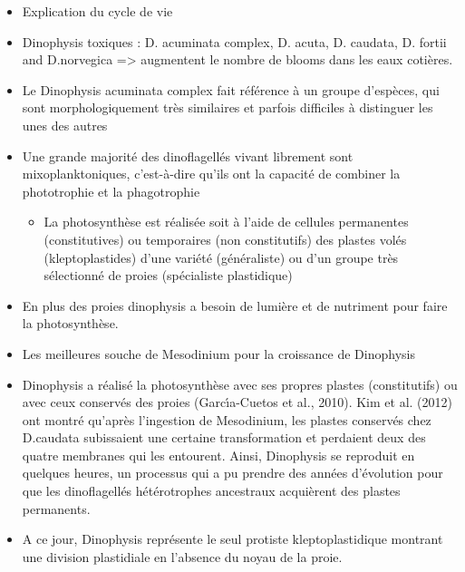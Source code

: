 \documentclass{article}
\begin{document}
\begin{itemize}
    \item Explication du cycle de vie
    \item Dinophysis toxiques : D. acuminata complex, D. acuta, D. caudata, D. fortii and D.norvegica => augmentent le nombre de blooms dans les eaux cotières. 
    \item Le Dinophysis acuminata complex fait référence à un groupe d'espèces, qui sont morphologiquement très similaires et parfois difficiles à distinguer les unes des autres
    \item Une grande majorité des dinoﬂagellés vivant librement sont mixoplanktoniques, c'est-à-dire qu'ils ont la capacité de combiner la phototrophie et la phagotrophie
\begin{itemize}
    \item La photosynthèse est réalisée soit à l'aide de cellules permanentes (constitutives) ou temporaires (non constitutifs) des plastes volés (kleptoplastides) d'une variété (généraliste) ou d'un groupe très sélectionné de proies (spécialiste plastidique)
\end{itemize}
\item  En plus des proies dinophysis a besoin de lumière et de nutriment pour faire la photosynthèse.
\item Les meilleures souche de Mesodinium pour la croissance de Dinophysis
\item Dinophysis a réalisé la photosynthèse avec ses propres plastes (constitutifs) ou avec ceux conservés des proies (Garcı́a-Cuetos et al., 2010). Kim et al. (2012) ont montré qu'après l'ingestion de Mesodinium, les plastes conservés chez D.caudata subissaient une certaine transformation et perdaient deux des quatre membranes qui les entourent. Ainsi, Dinophysis se reproduit en quelques heures, un processus qui a pu prendre des années d'évolution pour que les dinoflagellés hétérotrophes ancestraux acquièrent des plastes permanents.
\item A ce jour, Dinophysis représente le seul protiste kleptoplastidique montrant une division plastidiale en l'absence du noyau de la proie.
\end{itemize}
\end{document}
